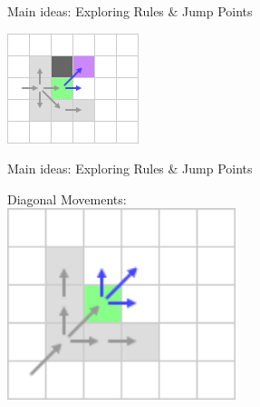 \documentclass{presentation}
\begin{document}
\begin{frame}{Main ideas: Exploring Rules \& Jump Points}
\begin{center}
\begin{minipage}{0.3\textwidth}
		\end{minipage}%
		\hfill%
		\begin{minipage}{0.3\textwidth}
			\includegraphics[width=\textwidth]{figures/extra_geschnitten/sm(forced).png}
		\end{minipage}%
	\end{center}
\end{frame}


\begin{frame}{Main ideas: Exploring Rules \& Jump Points}
	\begin{center}
		Diagonal Movements:\\
		\vspace{5mm}
		\includegraphics[width=0.5\textwidth]{figures/extra_geschnitten/dm.png}
	\end{center}
\end{frame}
\end{document}
